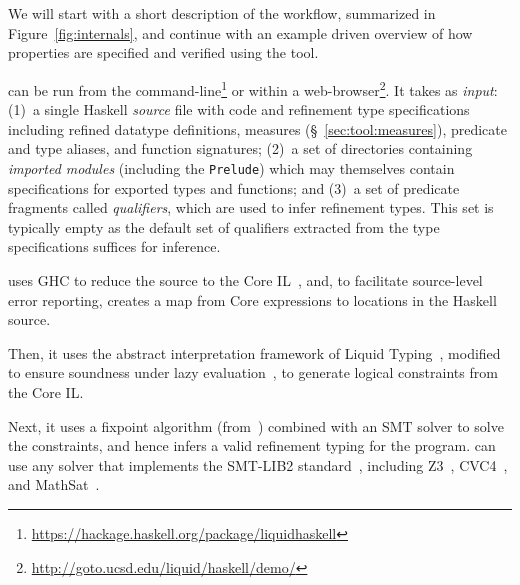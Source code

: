 \section{\toolname}\label{sec:liquidhaskell}
\begin{figure*}[ht!]
\noindent{}
\caption{\toolname Workflow}
	\label{fig:internals}
\end{figure*}
% 
%
We will start with a short description of the \toolname workflow,
summarized in Figure~\ref{fig:internals}, and continue with an 
example driven overview of how properties are specified
and verified using the tool. 

\toolname can be run from the command-line\footnote{\url{https://hackage.haskell.org/package/liquidhaskell}}
or within a web-browser\footnote{\url{http://goto.ucsd.edu/liquid/haskell/demo/}}.
It takes as \emph{input}:
%
(1)~a single Haskell \emph{source} file with code and refinement
    type specifications including refined datatype definitions, 
    measures (\S~\ref{sec:tool:measures}), predicate and type 
    aliases, and function signatures;
%
(2)~a set of directories containing \emph{imported modules} 
    (including the \verb+Prelude+) which may themselves 
    contain specifications for exported types and functions; and
%
(3)~a set of predicate fragments called \emph{qualifiers},
    which are used to infer refinement types. This set is 
    typically empty as the default set of qualifiers extracted 
    from the type specifications suffices for inference.

\toolname uses GHC to reduce the source to the Core IL~\cite{SulzmannCJD07}, 
and, to facilitate source-level error reporting, creates a map from Core 
expressions to locations in the Haskell source.

Then, it uses the abstract interpretation framework of Liquid Typing~\cite{LiquidPLDI08}, 
modified to ensure soundness under lazy evaluation~\citep{LiquidICFP14},
to generate logical constraints from the Core IL.
     
Next, it uses a fixpoint algorithm (from~\citep{LiquidPLDI08})
combined with an SMT solver to solve the constraints, and hence 
infers a valid refinement typing for the program. 
%
\toolname can use any solver that implements the SMT-LIB2
standard~\cite{SMTLIB2}, including Z3~\citep{Z3}, CVC4~\citep{CVC4}, and
MathSat~\citep{MathSat}.

